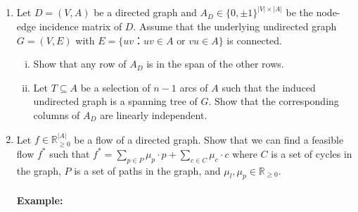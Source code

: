 \documentclass[11pt]{article}
\renewcommand{\geq}{\geqslant}
\begin{document}
\begin{enumerate}[1)]
\item Let $D = (V,A)$  be a directed graph and $A_D ∈ \{0,\pm1\}^{|V| × |A|}$ be the node-edge incidence matrix of $D$. Assume that the underlying undirected graph $G = (V,E)$  with $E = \{ uv ： uv ∈A \text{ or } vu ∈ A\}$ is connected. 
  \begin{enumerate}[i)]
  \item Show that any row of $A_D$ is in the span of the other rows.
  \item Let $T ⊆ A$ be a selection of $n-1$ arcs of $A$ such that the induced undirected graph is a spanning tree of $G$. Show that the corresponding columns of $A_D$ are linearly independent.
  \end{enumerate}
  
  
  
\item Let $f \in \mathbb{R}^{|A|}_{\geq 0}$ be a flow of a directed graph. Show that we can find a feasible flow $f^*$ such that $f^* = \sum_{p \in P}  \mu_p \cdot p + \sum_{c \in C}\mu_c \cdot c$ where $C$ is a set of cycles in the graph, $P$ is a set of paths in the graph, and $\mu_l, \mu_p \in \mathbb{R}_{\geq 0}$.

\medskip 

\paragraph{Example:}

\begin{figure}[h!]
    \centering
\end{figure}
\end{enumerate}
\end{document}
